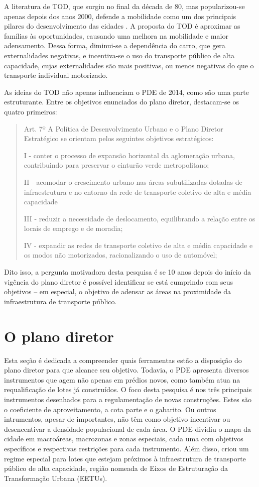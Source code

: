 A literatura de TOD, que surgiu no final da década de 80, mas popularizou-se apenas depois dos anos 2000, defende a mobilidade como um dos principais pilares do desenvolvimento das cidades \cite{Ibraeva2020}. A proposta do TOD é aproximar as famílias às oportunidades, causando uma melhora na mobilidade e maior adensamento. Dessa forma, diminui-se a dependência do carro, que gera externalidades negativas, e incentiva-se o uso do transporte público de alta capacidade, cujas externalidades são mais positivas, ou menos negativas do que o transporte individual motorizado.

As ideias do TOD não apenas influenciam o PDE de 2014, como são uma parte estruturante. Entre os objetivos enunciados do plano diretor, destacam-se os quatro primeiros:

\begin{quote}
    Art. 7º A Política de Desenvolvimento Urbano 
    e o Plano Diretor Estratégico se orientam pelos 
    seguintes objetivos estratégicos:

    I - conter o processo de expansão horizontal da aglomeração urbana, contribuindo para preservar o cinturão verde metropolitano;

    II - acomodar o crescimento urbano nas áreas subutilizadas dotadas de infraestrutura e no entorno da rede de transporte coletivo de alta e média capacidade

    III - reduzir a necessidade de deslocamento, equilibrando a relação entre os locais de emprego e de moradia;

    IV - expandir as redes de transporte coletivo de alta e média capacidade e os modos não motorizados, racionalizando o uso de automóvel;
\end{quote}

Dito isso, a pergunta motivadora desta pesquisa é se 10 anos depois do início da vigência do plano diretor é possível identificar se está cumprindo com seus objetivos -- em especial, o objetivo de adensar as áreas na proximidade da infraestrutura de transporte público.

\section{O plano diretor}

Esta seção é dedicada a compreender quais ferramentas estão a disposição do plano diretor para que alcance seu objetivo. Todavia, o PDE apresenta diversos instrumentos que agem não apenas em prédios novos, como também atua na requalificação de lotes já construídos. O foco desta pesquisa é nos três principais instrumentos desenhados para a regulamentação de novas construções. Estes são o coeficiente de aproveitamento, a cota parte e o gabarito. Ou outros intrumentos, apesar de importantes, não têm como objetivo incentivar ou desencentivar a densidade populacional de cada área. O PDE dividiu o mapa da cidade em macroáreas, macrozonas e zonas especiais, cada uma com objetivos específicos e respectivas restrições para cada instrumento. Além disso, criou um regime especial para lotes que estejam próximos à infraestrutura de transporte público de alta capacidade, região nomeada de Eixos de Estruturação da Transformação Urbana (EETUs). 

